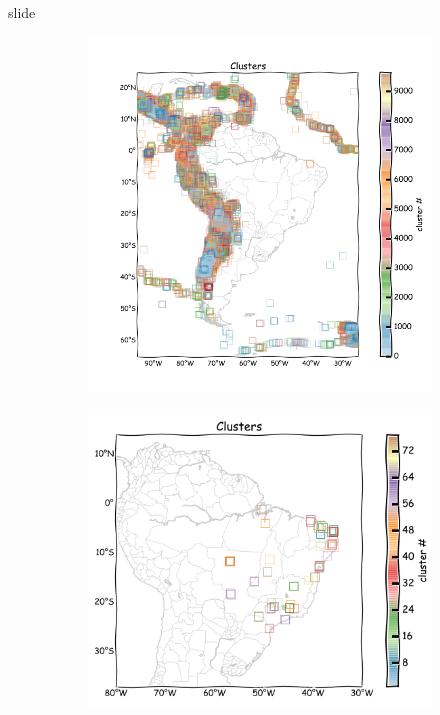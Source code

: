 \documentclass[ucs,8pt]{beamer}
\begin{document}
\begin{frame}{slide}

\begin{figure}[H]
	\centering
	\begin{subfigure}[t]{0.46\textheight}
		  	\centering
			\includegraphics[height=1.00\textheight]{hmtk_sa3_pp_decluster}
			\label{fig:sa_decluster}
	\end{subfigure}%
	\quad %
	\begin{subfigure}[t]{0.50\textheight}
		  	\centering
			\includegraphics[height=1.00\textheight]{hmtk_bsb2013_pp_decluster}

\end{subfigure}
\end{figure}
\end{frame}
\end{document}
